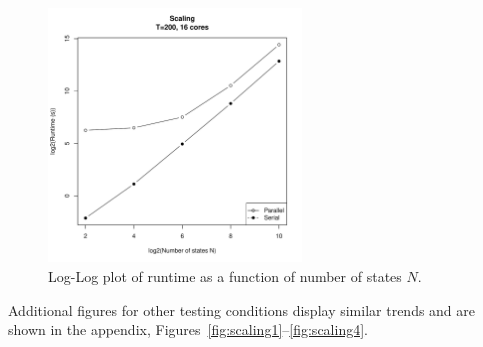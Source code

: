 \begin{figure}[htb]
    \centering
    \includegraphics[width=0.6\textwidth]{../figure/scaling-cores_16-T_200.pdf}
    \caption{Log-Log plot of runtime as a function of number of states $N$.}
    \label{fig:scaling-16-200}
\end{figure}

Additional figures for other testing conditions display similar trends and are
shown in the appendix, Figures~\ref{fig:scaling1}--\ref{fig:scaling4}. 

